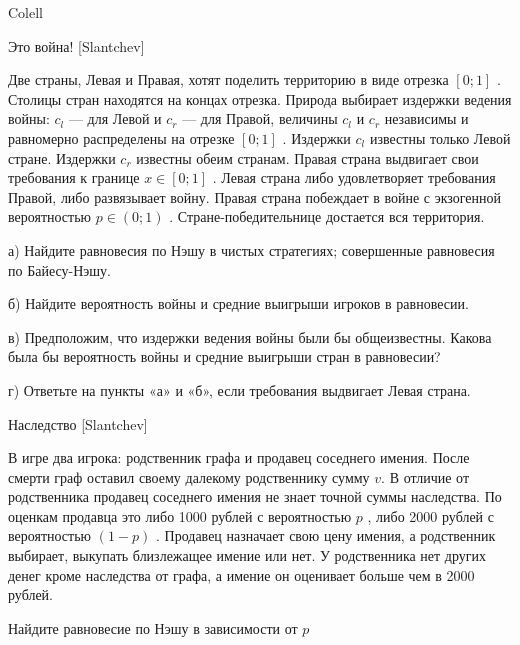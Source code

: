 \begin{source}
Colell
\end{source}




\begin{problem}
 Это война! [Slantchev]\par
Две страны, Левая и Правая, хотят поделить территорию в виде отрезка  $\left[0;1\right]$ . Столицы стран находятся на концах отрезка. Природа выбирает издержки ведения войны:  $c_{l} $  — для Левой и  $c_{r} $  — для Правой, величины  $c_{l} $  и  $c_{r} $  независимы и равномерно распределены на отрезке  $\left[0;1\right]$ . Издержки  $c_{l} $  известны только Левой стране. Издержки  $c_{r} $  известны обеим странам. Правая страна выдвигает свои требования к границе  $x\in \left[0;1\right]$ . Левая страна либо удовлетворяет требования Правой, либо развязывает войну. Правая страна побеждает в войне с экзогенной вероятностью  $p\in \left(0;1\right)$ . Стране-победительнице достается вся территория.\par
а)      Найдите равновесия по Нэшу в чистых стратегиях; совершенные равновесия по Байесу-Нэшу.\par
б)      Найдите вероятность войны и средние выигрыши игроков в равновесии.\par
в)      Предположим, что издержки ведения войны были бы общеизвестны. Какова была бы вероятность войны и средние выигрыши стран в равновесии?\par
г)      Ответьте на пункты «а» и «б», если требования выдвигает Левая страна.



\begin{sol}

\end{sol}
\end{problem}



\begin{problem}
 Наследство [Slantchev]\par
В игре два игрока: родственник графа и продавец соседнего имения. После смерти граф оставил своему далекому родственнику сумму  $v$. В отличие от родственника продавец соседнего имения не знает точной суммы наследства. По оценкам продавца это либо 1000 рублей с вероятностью  $p$ , либо 2000 рублей с вероятностью  $\left(1-p\right)$ . Продавец назначает свою цену имения, а родственник выбирает, выкупать близлежащее имение или нет. У родственника нет других денег кроме наследства от графа, а имение он оценивает больше чем в 2000 рублей.\par
Найдите равновесие по Нэшу в зависимости от  $p$\par



\begin{sol}

\end{sol}
\end{problem}






